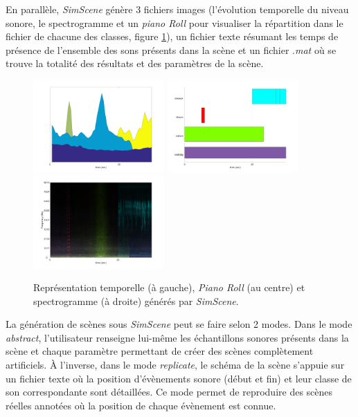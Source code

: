 En parallèle, \textit{SimScene} génère 3 fichiers images (l'évolution temporelle du niveau sonore, le spectrogramme et un \textit{piano Roll} pour visualiser la répartition dans le fichier de chacune des classes, figure \ref{fig:somefiglabel}), un fichier texte résumant les temps de présence de l'ensemble des sons présents dans la scène et un fichier .\textit{mat} où se trouve la totalité des résultats et des paramètres de la scène.\\


\begin{figure}[ht]
\includegraphics[width=5cm]{./figures/SimScene/exempleSimScene2-timeDomain.png}\hfill
\includegraphics[width=5cm]{./figures/SimScene/exempleSimScene2-pianoRoll.png}\hfill
\includegraphics[width=5cm]{./figures/SimScene/exempleSimScene2-spectrum.png}
\caption{Représentation temporelle (à gauche), \textit{Piano Roll} (au centre) et spectrogramme (à droite) générés par \textit{SimScene}.}\label{fig:somefiglabel}
\end{figure}

La génération de scènes sous \textit{SimScene} peut se faire selon 2 modes. Dans le mode \textit{abstract}, l'utilisateur renseigne lui-même les échantillons sonores présents dans la scène et chaque paramètre permettant de créer des scènes complètement artificiels. \`A l'inverse, dans le mode \textit{replicate}, le schéma de la scène s'appuie sur un fichier texte où la position d'évènements sonore (début et fin) et leur classe de son correspondante sont détaillées. Ce mode permet de reproduire des scènes réelles annotées où la position de chaque évènement est connue.\\

